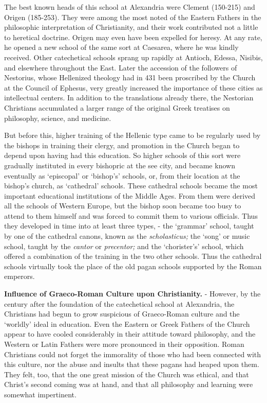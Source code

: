 \documentclass[]{book}
\begin{document}
The best known heads of this school at Alexandria were Clement (150-215) and Origen (185-253). They were among the most noted of the Eastern Fathers in the philosophic interpretation of Christianity, and their work contributed not a little to heretical doctrine. Origen may even have been expelled for heresy. At any rate, he opened a new school of the same sort at Caesarea, where he was kindly received. Other catechetical schools sprang up rapidly at Antioch, Edessa, Nisibis, and elsewhere throughout the East. Later the accession of the followers of Nestorius, whose Hellenized theology had in 431 been proscribed by the Church at the Council of Ephesus, very greatly increased the importance of these cities as intellectual centers. In addition to the translations already there, the Nestorian Christians accumulated a larger range of the original Greek treatises on philosophy, science, and medicine.

But before this, higher training of the Hellenic type came to be regularly used by the bishops in training their clergy, and promotion in the Church began to depend upon having had this education. So higher schools of this sort were gradually instituted in every bishopric at the see city, and became known eventually as `episcopal' or `bishop's' schools, or, from their location at the bishop's church, as `cathedral' schools. These cathedral schools became the most important educational institutions of the Middle Ages. From them were derived all the schools of Western Europe, but the bishop soon became too busy to attend to them himself and was forced to commit them to various officials. Thus they developed in time into at least three types, - the `grammar' school, taught by one of the cathedral canons, known as the \emph{scholasticus;} the `song' or music school, taught by the \emph{cantor} or \emph{precentor;} and the `chorister's' school, which offered a combination of the training in the two other schools. Thus the cathedral schools virtually took the place of the old pagan schools supported by the Roman emperors.

\textbf{Influence of Graeco-Roman Culture upon Christianity.} - However, by the century after the foundation of the catechetical school at Alexandria, the Christians had begun to grow suspicious of Graeco-Roman culture and the `worldly' ideal in education. Even the Eastern or Greek Fathers of the Church appear to have cooled considerably in their attitude toward philosophy, and the Western or Latin Fathers were more pronounced in their opposition. Roman Christians could not forget the immorality of those who had been connected with this culture, nor the abuse and insults that these pagans had heaped upon them. They felt, too, that the one great mission of the Church was ethical, and that Christ's second coming was at hand, and that all philosophy and learning were somewhat impertinent.
\end{document}
